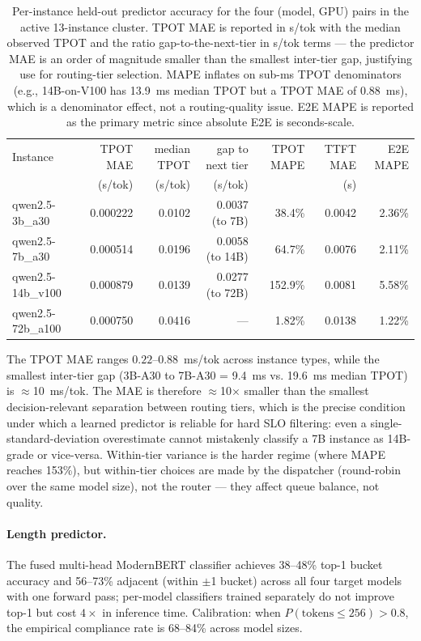 \documentclass[10pt]{article}
\begin{document}
\begin{table}[h]
\centering
\small
\caption{Per-instance held-out predictor accuracy for the four (model, GPU) pairs in the active 13-instance cluster. TPOT MAE is reported in s/tok with the median observed TPOT and the ratio gap-to-the-next-tier in s/tok terms — the predictor MAE is an order of magnitude smaller than the smallest inter-tier gap, justifying use for routing-tier selection. MAPE inflates on sub-ms TPOT denominators (e.g., 14B-on-V100 has 13.9~ms median TPOT but a TPOT MAE of 0.88~ms), which is a denominator effect, not a routing-quality issue. E2E MAPE is reported as the primary metric since absolute E2E is seconds-scale.}
\label{tab:predictor-mae}
\begin{tabular}{lrrrrrr}
\toprule
Instance & TPOT MAE & median TPOT & gap to next tier & TPOT MAPE & TTFT MAE & E2E MAPE \\
         & (s/tok)  & (s/tok)     & (s/tok)          &           & (s)      &          \\
\midrule
qwen2.5-3b\_a30    & 0.000222 & 0.0102 & 0.0037 (to 7B)   & 38.4\%   & 0.0042 & 2.36\% \\
qwen2.5-7b\_a30    & 0.000514 & 0.0196 & 0.0058 (to 14B)  & 64.7\%   & 0.0076 & 2.11\% \\
qwen2.5-14b\_v100  & 0.000879 & 0.0139 & 0.0277 (to 72B)  & 152.9\%  & 0.0081 & 5.58\% \\
qwen2.5-72b\_a100  & 0.000750 & 0.0416 & ---              & 1.82\%   & 0.0138 & 1.22\% \\
\bottomrule
\end{tabular}
\end{table}

The TPOT MAE ranges $0.22$--$0.88$~ms/tok across instance types, while the smallest inter-tier gap (3B-A30 to 7B-A30 = 9.4~ms vs. 19.6~ms median TPOT) is $\approx$10~ms/tok. The MAE is therefore $\approx$10$\times$ smaller than the smallest decision-relevant separation between routing tiers, which is the precise condition under which a learned predictor is reliable for hard SLO filtering: even a single-standard-deviation overestimate cannot mistakenly classify a 7B instance as 14B-grade or vice-versa. Within-tier variance is the harder regime (where MAPE reaches 153\%), but within-tier choices are made by the dispatcher (round-robin over the same model size), not the router — they affect queue balance, not quality.

\paragraph{Length predictor.}
The fused multi-head ModernBERT classifier achieves 38–48\% top-1 bucket accuracy and 56–73\% adjacent (within $\pm$1 bucket) across all four target models with one forward pass; per-model classifiers trained separately do not improve top-1 but cost $4\times$ in inference time. Calibration: when $P(\text{tokens} \le 256) > 0.8$, the empirical compliance rate is 68–84\% across model sizes.
\end{document}
